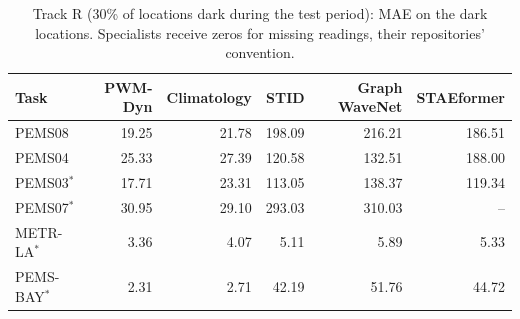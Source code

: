 \begin{table}[h]
\caption{Track R (30\% of locations dark during the test period): MAE on the dark locations. Specialists receive zeros for missing readings, their repositories' convention.}
\label{tab:trackr}
\scriptsize
\setlength{\tabcolsep}{3pt}
\begin{tabular}{@{}lrrrrr@{}}
\toprule
Task & PWM-Dyn & Climatology & STID & Graph WaveNet & STAEformer \\
\midrule
PEMS08 & 19.25 & 21.78 & 198.09 & 216.21 & 186.51 \\
PEMS04 & 25.33 & 27.39 & 120.58 & 132.51 & 188.00 \\
PEMS03$^\ast$ & 17.71 & 23.31 & 113.05 & 138.37 & 119.34 \\
PEMS07$^\ast$ & 30.95 & 29.10 & 293.03 & 310.03 & -- \\
METR-LA$^\ast$ & 3.36 & 4.07 & 5.11 & 5.89 & 5.33 \\
PEMS-BAY$^\ast$ & 2.31 & 2.71 & 42.19 & 51.76 & 44.72 \\
\bottomrule
\end{tabular}
\end{table}